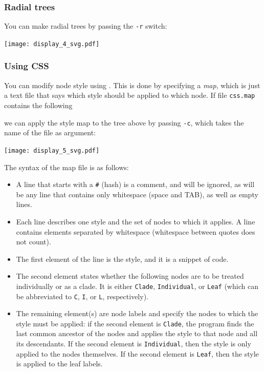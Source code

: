 \subsubsection{Radial trees}

You can make radial trees by passing the \texttt{-r} switch:

\begin{center}
\texttt{[image: display\_4\_svg.pdf]}
\end{center}

\subsubsection{Using CSS}
\label{sct_display_svg_css}

You can modify node style using \css. This is done by specifying a
\textit{\css{} map}, which is just a text file that says which style should be
applied to which node. If file \texttt{css.map} contains the following
\begin{quote}

\end{quote} we can apply the style map to
the tree above by passing \texttt{-c}, which takes the name of the \css{} file
as argument:


\begin{center}
 \texttt{[image: display\_5\_svg.pdf]}
\end{center}

The syntax of the \css{} map file is as follows:
\begin{itemize}
	\item A line that starts with a \texttt{\#} (hash) is a comment, and will be
	ignored, as will be any line that contains only whitespace (space and TAB),
	as well as empty lines.
	\item Each line describes one style and the set of nodes to which it applies.
	A line contains elements separated by whitespace (whitespace between quotes
	does not count). 
	\item The first element of the line is the style, and it is a snippet of
	\css{} code. 
	\item The second element states whether the following nodes are to be treated
	individually or as a clade. It is either \texttt{Clade},
	\texttt{Individual}, or \texttt{Leaf} (which can be abbreviated to \texttt{C},
	\texttt{I}, or \texttt{L}, respectively). 
	\item The remaining element(s) are node labels and specify the nodes to which
	the style must be applied: if the second element is \texttt{Clade}, the
	program finds the last common ancestor of the nodes and applies the style to
	that node and all its descendants. If the second element is
	\texttt{Individual}, then the style is only applied to the nodes themselves.
	If the second element is \texttt{Leaf}, then the style is applied to the leaf
	labels.
\end{itemize}

